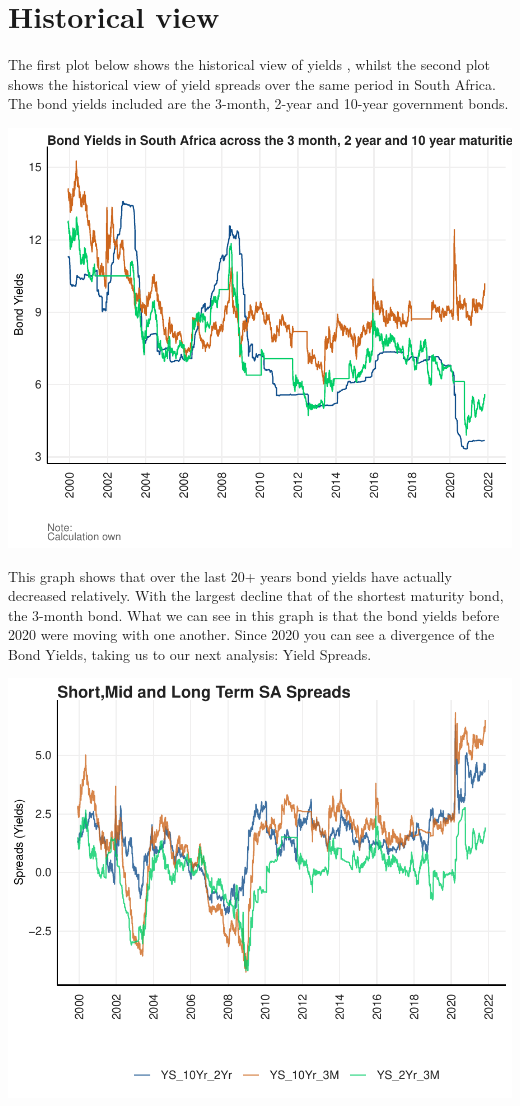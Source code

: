 \documentclass[11pt,preprint, authoryear]{elsarticle}
\numberwithin{equation}{section}
\numberwithin{figure}{section}
\numberwithin{table}{section}
\begin{document}
\hypertarget{historical-view}{%
\section{Historical view}\label{historical-view}}

The first plot below shows the historical view of yields , whilst the
second plot shows the historical view of yield spreads over the same
period in South Africa. The bond yields included are the 3-month, 2-year
and 10-year government bonds.

\includegraphics{Question2_files/figure-latex/unnamed-chunk-3-1.pdf}

This graph shows that over the last 20+ years bond yields have actually
decreased relatively. With the largest decline that of the shortest
maturity bond, the 3-month bond. What we can see in this graph is that
the bond yields before 2020 were moving with one another. Since 2020 you
can see a divergence of the Bond Yields, taking us to our next analysis:
Yield Spreads.

\includegraphics{Question2_files/figure-latex/unnamed-chunk-5-1.pdf}
\end{document}
